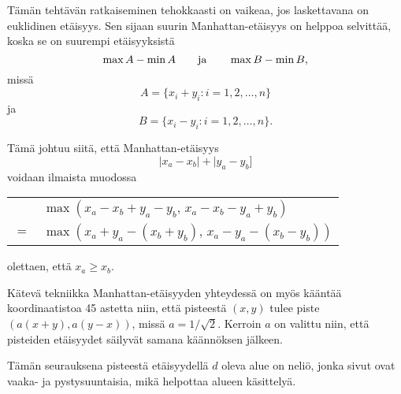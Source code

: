 Tämän tehtävän ratkaiseminen tehokkaasti on vaikeaa,
jos laskettavana on euklidinen etäisyys.
Sen sijaan suurin Manhattan-etäisyys on helppoa selvittää,
koska se on suurempi etäisyyksistä
\[\max A - \min A \hspace{20px} \textrm{ja} \hspace{20px} \max B - \min B,\]
missä
\[A = \{x_i+y_i : i = 1,2,\ldots,n\}\]
ja
\[B = \{x_i-y_i : i = 1,2,\ldots,n\}.\]
\begin{samepage}
Tämä johtuu siitä, että Manhattan-etäisyys
\[|x_a-x_b|+|y_a-y_b]\]
voidaan ilmaista muodossa
\begin{center}
\begin{tabular}{cl}
& $\max(x_a-x_b+y_a-y_b,\,x_a-x_b-y_a+y_b)$ \\
$=$ & $\max(x_a+y_a-(x_b+y_b),\,x_a-y_a-(x_b-y_b))$
\end{tabular}
\end{center}
olettaen, että $x_a \ge x_b$.
\end{samepage}

\begin{samepage}
Kätevä tekniikka Manhattan-etäisyyden yhteydessä on myös
kääntää koordinaatistoa 45 astetta
niin, että pisteestä $(x,y)$ tulee piste $(a(x+y),a(y-x))$,
missä $a=1/\sqrt{2}$.
Kerroin $a$ on valittu niin, että
pisteiden etäisyydet säilyvät samana käännöksen jälkeen.

Tämän seurauksena pisteestä etäisyydellä $d$ oleva alue
on neliö, jonka sivut ovat vaaka- ja pystysuuntaisia,
mikä helpottaa alueen käsittelyä.
\begin{center}
\end{center}
\end{samepage}
